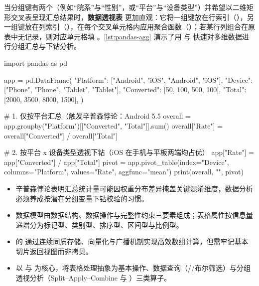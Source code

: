当分组键有两个（例如“院系”与“性别”，或“平台”与“设备类型”）并希望以二维矩形交叉表呈现汇总结果时，\textbf{数据透视表}  更加直观：它将一组键放在行索引（），另一组键放在列索引（），在每个交叉单元格内应用聚合函数（）；若某行列组合在原表中无记录，则对应单元格填 。\cref{lst:pandas-agg} 演示了用  与  快速对多维数据进行分组汇总与下钻分析。

\begin{codeblock}[language=Python,caption={使用 \texttt{groupby} 与 \texttt{pivot\_table} 进行分组聚合与下钻分析},label=lst:pandas-agg]
import pandas as pd

app = pd.DataFrame({
    "Platform": ["Android", "iOS", "Android", "iOS"],
    "Device":   ["Phone", "Phone", "Tablet", "Tablet"],
    "Converted": [50, 100, 500, 100],
    "Total":     [2000, 3500, 8000, 1500],
})

# 1. 仅按平台汇总（触发辛普森悖论：Android 5.5%
overall = app.groupby("Platform")[["Converted", "Total"]].sum()
overall["Rate"] = overall["Converted"] / overall["Total"]

# 2. 按平台 x 设备类型透视下钻（iOS 在手机与平板两端均占优）
app["Rate"] = app["Converted"] / app["Total"]
pivot = app.pivot_table(index="Device", columns="Platform", values="Rate", aggfunc="mean")
print(overall, "\n\n", pivot)
\end{codeblock}

\begin{summary}[本章要点]
\begin{itemize}
  \item 辛普森悖论表明汇总统计量可能因权重分布差异掩盖关键混淆维度，数据分析必须养成按潜在分组变量下钻校验的习惯。
  \item 数据模型由数据结构、数据操作与完整性约束三要素组成；表格属性按信息量递增分为标记型、类别型、排序型、区间型与比例型。
  \item {} 的  通过连续同质存储、向量化与广播机制实现高效数组计算，但需牢记基本切片返回视图而非拷贝。
  \item {} 以  与  为核心，将表格处理抽象为基本操作、数据查询（//布尔筛选）与分组透视分析（Split–Apply–Combine 与 ）三类算子。
\end{itemize}
\end{summary}
